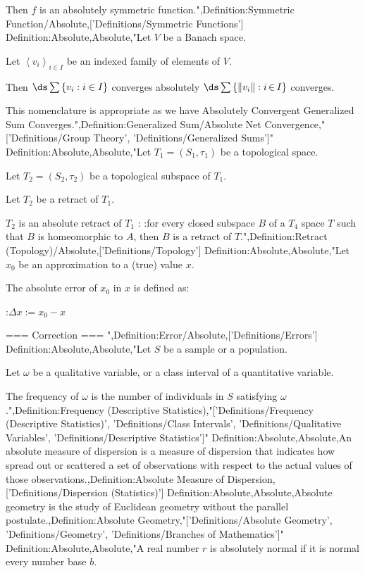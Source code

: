 Then $f$ is an absolutely symmetric function.",Definition:Symmetric Function/Absolute,['Definitions/Symmetric Functions']
Definition:Absolute,Absolute,"Let $V$ be a Banach space.

Let $\left\langle v_i \right\rangle_{i \mathop \in I}$ be an indexed family of elements of $V$.


Then $\ds \sum \left\lbrace v_i: i \in I \right\rbrace$ converges absolutely  $\ds \sum \left\lbrace \left\lVert v_i \right\rVert: i \mathop \in I \right\rbrace$ converges.

This nomenclature is appropriate as we have Absolutely Convergent Generalized Sum Converges.",Definition:Generalized Sum/Absolute Net Convergence,"['Definitions/Group Theory', 'Definitions/Generalized Sums']"
Definition:Absolute,Absolute,"Let $T_1 = \left( S_1, \tau_1 \right)$ be a topological space.

Let $T_2 = \left( S_2, \tau_2 \right)$ be a topological subspace of $T_1$.


Let $T_2$ be a retract of $T_1$.


$T_2$ is an absolute retract of $T_1$ :
:for every closed subspace $B$ of a $T_4$ space $T$ such that $B$ is homeomorphic to $A$, then $B$ is a retract of $T$.",Definition:Retract (Topology)/Absolute,['Definitions/Topology']
Definition:Absolute,Absolute,"Let $x_0$ be an approximation to a (true) value $x$.


The absolute error of $x_0$ in $x$ is defined as:

:$\Delta x := x_0 - x$


=== Correction ===
",Definition:Error/Absolute,['Definitions/Errors']
Definition:Absolute,Absolute,"Let $S$ be a sample or a population.

Let $\omega$ be a qualitative variable, or a class interval of a quantitative variable.


The frequency of $\omega$ is the number of individuals in $S$ satisfying $\omega$.",Definition:Frequency (Descriptive Statistics),"['Definitions/Frequency (Descriptive Statistics)', 'Definitions/Class Intervals', 'Definitions/Qualitative Variables', 'Definitions/Descriptive Statistics']"
Definition:Absolute,Absolute,An absolute measure of dispersion is a measure of dispersion that indicates how spread out or scattered a set of observations with respect to the actual values of those observations.,Definition:Absolute Measure of Dispersion,['Definitions/Dispersion (Statistics)']
Definition:Absolute,Absolute,Absolute geometry is the study of Euclidean geometry without the parallel postulate.,Definition:Absolute Geometry,"['Definitions/Absolute Geometry', 'Definitions/Geometry', 'Definitions/Branches of Mathematics']"
Definition:Absolute,Absolute,"A real number $r$ is absolutely normal if it is normal  every number base $b$.

